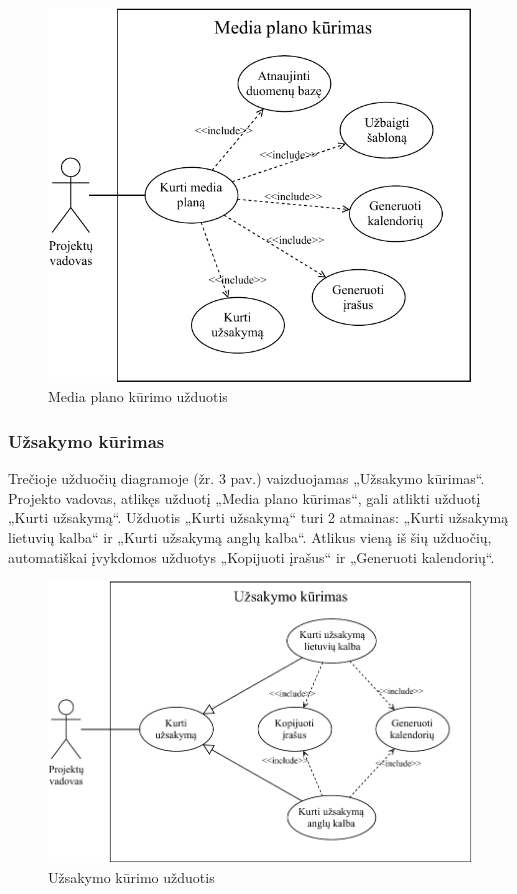 \begin{figure}[H]
    \centering
    \includegraphics[scale=0.95]{Images/use-case-media-plan.pdf}
    \caption{Media plano kūrimo užduotis}
    \label{img:model}
\end{figure}

\subsubsection {Užsakymo kūrimas}
Trečioje užduočių diagramoje (žr. 3 pav.) vaizduojamas „Užsakymo kūrimas“. Projekto vadovas, atlikęs užduotį „Media plano kūrimas“, gali atlikti užduotį „Kurti užsakymą“. Užduotis „Kurti užsakymą“ turi 2 atmainas: „Kurti užsakymą lietuvių kalba“ ir „Kurti užsakymą anglų kalba“. Atlikus vieną iš šių užduočių, automatiškai įvykdomos užduotys „Kopijuoti įrašus“ ir „Generuoti kalendorių“.

\begin{figure}[H]
    \centering
    \includegraphics[scale=0.85]{Images/use-case-order.pdf}
    \caption{Užsakymo kūrimo užduotis}
    \label{img:model}
\end{figure}

